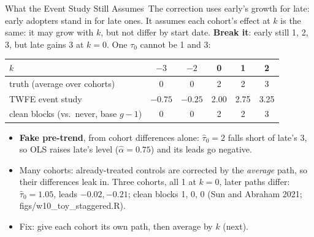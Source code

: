 \documentclass[aspectratio=169,11pt,xcolor=dvipsnames]{beamer}
\newcommand{\srcp}[1]{{\scriptsize\color{gray}(#1)}}
\newcommand{\core}{\,\raisebox{0.6pt}{\textcolor{corestar}{$\bigstar$}}}
\begin{document}
\begin{frame}{What the Event Study Still Assumes\core}
The correction uses early's growth for late: early adopters stand in for late ones. It assumes
\alert{each cohort's effect at $k$ is the same}: it may grow with $k$, but not differ by start date.
\vskip3pt
\textbf{Break it}: early still 1, 2, 3, but late gains 3 at $k = 0$. One $\tau_0$ cannot be 1 and 3:
\vskip2pt
\begin{center}\footnotesize
\renewcommand{\arraystretch}{1.1}
\begin{tabular}{@{}lccccc@{}}
\toprule
$k$ & $-3$ & $-2$ & 0 & 1 & 2 \\
\midrule
truth (average over cohorts) & 0 & 0 & 2 & 2 & 3 \\
TWFE event study & \alert{$-0.75$} & \alert{$-0.25$} & 2.00 & \alert{2.75} & \alert{3.25} \\
clean blocks (vs.\ never, base $g - 1$) & 0 & 0 & 2 & 2 & 3 \\
\bottomrule
\end{tabular}
\end{center}
\vskip2pt
\begin{itemize}\itemsep1pt\small
  \item \textbf{Fake pre-trend}, from cohort differences alone: $\hat\tau_0 = 2$ falls short of
        late's 3, so OLS raises late's level ($\hat\alpha = 0.75$) and its leads go negative.
  \item Many cohorts: already-treated controls are corrected by the \emph{average} path, so
        their differences leak in. Three cohorts, all 1 at $k = 0$, later paths differ:
        $\hat\tau_0 = 1.05$, leads $-0.02, -0.21$; clean blocks 1, 0, 0
        \srcp{Sun and Abraham 2021; figs/w10\_toy\_staggered.R}.
  \item Fix: give each cohort its own path, then average by $k$ (next).
\end{itemize}
\end{frame}
\end{document}

